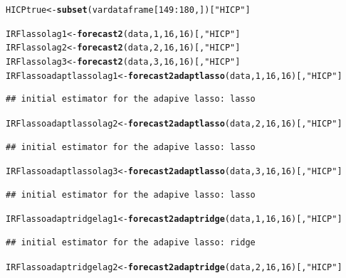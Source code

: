 \documentclass[11pt,oneside, a4paper]{amsart}\usepackage[]{graphicx}\usepackage[]{color}
\makeatletter
\newcommand{\hlnum}[1]{\textcolor[rgb]{0.686,0.059,0.569}{#1}}%
\newcommand{\hlstr}[1]{\textcolor[rgb]{0.192,0.494,0.8}{#1}}%
\newcommand{\hlopt}[1]{\textcolor[rgb]{0,0,0}{#1}}%
\newcommand{\hlstd}[1]{\textcolor[rgb]{0.345,0.345,0.345}{#1}}%
\newcommand{\hlkwb}[1]{\textcolor[rgb]{0.69,0.353,0.396}{#1}}%
\newcommand{\hlkwd}[1]{\textcolor[rgb]{0.737,0.353,0.396}{\textbf{#1}}}%
\newenvironment{kframe}{%
 \def\at@end@of@kframe{}%
 \ifinner\ifhmode%
  \def\at@end@of@kframe{\end{minipage}}%
  \begin{minipage}{\columnwidth}%
 \fi\fi%
 \def\FrameCommand##1{\hskip\@totalleftmargin \hskip-\fboxsep
 \colorbox{shadecolor}{##1}\hskip-\fboxsep
     \hskip-\linewidth \hskip-\@totalleftmargin \hskip\columnwidth}%
 \MakeFramed {\advance\hsize-\width
   \@totalleftmargin\z@ \linewidth\hsize
   \@setminipage}}%
 {\par\unskip\endMakeFramed%
 \at@end@of@kframe}
\newenvironment{knitrout}{}{} %
\makeatother
\begin{document}
\begin{knitrout}
\color{fgcolor}\begin{kframe}
\begin{alltt}
\hlstd{HICPtrue}\hlkwb{<-}\hlkwd{subset}\hlstd{(vardataframe[}\hlnum{149}\hlopt{:}\hlnum{180}\hlstd{,])[}\hlstr{"HICP"}\hlstd{]}

\hlstd{IRFlassolag1}\hlkwb{<-}\hlkwd{forecast2}\hlstd{(data,}\hlnum{1}\hlstd{,}\hlnum{16}\hlstd{,}\hlnum{16}\hlstd{)[,}\hlstr{"HICP"}\hlstd{]}
\hlstd{IRFlassolag2}\hlkwb{<-}\hlkwd{forecast2}\hlstd{(data,}\hlnum{2}\hlstd{,}\hlnum{16}\hlstd{,}\hlnum{16}\hlstd{)[,}\hlstr{"HICP"}\hlstd{]}
\hlstd{IRFlassolag3}\hlkwb{<-}\hlkwd{forecast2}\hlstd{(data,}\hlnum{3}\hlstd{,}\hlnum{16}\hlstd{,}\hlnum{16}\hlstd{)[,}\hlstr{"HICP"}\hlstd{]}
\hlstd{IRFlassoadaptlassolag1}\hlkwb{<-}\hlkwd{forecast2adaptlasso}\hlstd{(data,}\hlnum{1}\hlstd{,}\hlnum{16}\hlstd{,}\hlnum{16}\hlstd{)[,}\hlstr{"HICP"}\hlstd{]}
\end{alltt}
\begin{verbatim}
## initial estimator for the adapive lasso: lasso
\end{verbatim}
\begin{alltt}
\hlstd{IRFlassoadaptlassolag2}\hlkwb{<-}\hlkwd{forecast2adaptlasso}\hlstd{(data,}\hlnum{2}\hlstd{,}\hlnum{16}\hlstd{,}\hlnum{16}\hlstd{)[,}\hlstr{"HICP"}\hlstd{]}
\end{alltt}
\begin{verbatim}
## initial estimator for the adapive lasso: lasso
\end{verbatim}
\begin{alltt}
\hlstd{IRFlassoadaptlassolag3}\hlkwb{<-}\hlkwd{forecast2adaptlasso}\hlstd{(data,}\hlnum{3}\hlstd{,}\hlnum{16}\hlstd{,}\hlnum{16}\hlstd{)[,}\hlstr{"HICP"}\hlstd{]}
\end{alltt}
\begin{verbatim}
## initial estimator for the adapive lasso: lasso
\end{verbatim}
\begin{alltt}
\hlstd{IRFlassoadaptridgelag1}\hlkwb{<-}\hlkwd{forecast2adaptridge}\hlstd{(data,}\hlnum{1}\hlstd{,}\hlnum{16}\hlstd{,}\hlnum{16}\hlstd{)[,}\hlstr{"HICP"}\hlstd{]}
\end{alltt}
\begin{verbatim}
## initial estimator for the adapive lasso: ridge
\end{verbatim}
\begin{alltt}
\hlstd{IRFlassoadaptridgelag2}\hlkwb{<-}\hlkwd{forecast2adaptridge}\hlstd{(data,}\hlnum{2}\hlstd{,}\hlnum{16}\hlstd{,}\hlnum{16}\hlstd{)[,}\hlstr{"HICP"}\hlstd{]}

\end{alltt}
\end{kframe}
\end{knitrout}
\end{document}
